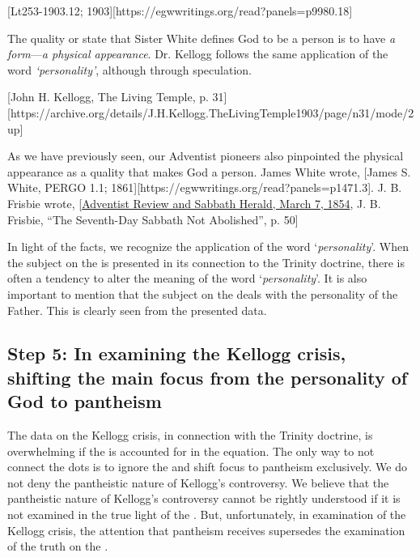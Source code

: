 [Lt253-1903.12; 1903][https://egwwritings.org/read?panels=p9980.18]

The quality or state that Sister White defines God to be a person is to have \textit{a form}—\textit{a physical appearance}. Dr. Kellogg follows the same application of the word \textit{‘personality’}, although through speculation.

[John H. Kellogg, The Living Temple, p. 31][https://archive.org/details/J.H.Kellogg.TheLivingTemple1903/page/n31/mode/2up]

As we have previously seen, our Adventist pioneers also pinpointed the physical appearance as a quality that makes God a person. James White wrote, [James S. White, PERGO 1.1; 1861][https://egwwritings.org/read?panels=p1471.3]. J. B. Frisbie wrote, [\href{https://documents.adventistarchives.org/Periodicals/RH/RH18540307-V05-07.pdf}{Adventist Review and Sabbath Herald, March 7, 1854}, J. B. Frisbie, “The Seventh-Day Sabbath Not Abolished”, p. 50]

In light of the facts, we recognize the application of the word ‘\textit{personality}’. When the subject on the  is presented in its connection to the Trinity doctrine, there is often a tendency to alter the meaning of the word ‘\textit{personality}’. It is also important to mention that the subject on the  deals with the personality of the Father. This is clearly seen from the presented data.

\subsection*{Step 5: In examining the Kellogg crisis, shifting the main focus from the personality of God to pantheism}

The data on the Kellogg crisis, in connection with the Trinity doctrine, is overwhelming if the  is accounted for in the equation. The only way to not connect the dots is to ignore the  and shift focus to pantheism exclusively. We do not deny the pantheistic nature of Kellogg's controversy. We believe that the pantheistic nature of Kellogg's controversy cannot be rightly understood if it is not examined in the true light of the . But, unfortunately, in examination of the Kellogg crisis, the attention that pantheism receives supersedes the examination of the truth on the .

